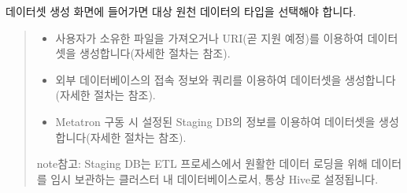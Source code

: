 \documentclass[letterpaper,10pt,english]{sphinxmanual}
\begin{document}
데이터셋 생성 화면에 들어가면 대상 원천 데이터의 타입을 선택해야 합니다.
\begin{quote}

\begin{figure}[H]
\centering

\noindent{}
\end{figure}
\begin{itemize}
\item {} 
 사용자가 소유한 파일을 가져오거나 URI(곧 지원 예정)를 이용하여 데이터셋을 생성합니다(자세한 절차는 {\hyperref[\detokenize{discovery/part07/create_a_dataset:create-a-dataset-of-file}]{}} 참조).

\item {} 
 외부 데이터베이스의 접속 정보와 쿼리를 이용하여 데이터셋을 생성합니다(자세한 절차는 {\hyperref[\detokenize{discovery/part07/create_a_dataset:create-a-dataset-of-database}]{}} 참조).

\item {} 
 Metatron 구동 시 설정된 Staging DB의 정보를 이용하여 데이터셋을 생성합니다(자세한 절차는 {\hyperref[\detokenize{discovery/part07/create_a_dataset:create-a-dataset-of-stagingdb}]{}} 참조).

\end{itemize}

\begin{sphinxadmonition}{note}{참고:}
Staging DB는 ETL 프로세스에서 원활한 데이터 로딩을 위해 데이터를 임시 보관하는 클러스터 내 데이터베이스로서, 통상 Hive로 설정됩니다.
\end{sphinxadmonition}
\end{quote}
\end{document}
